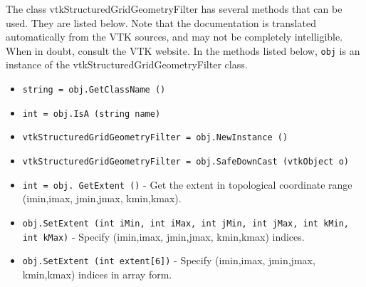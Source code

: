 The class vtkStructuredGridGeometryFilter has several methods that can be used.
  They are listed below.
Note that the documentation is translated automatically from the VTK sources,
and may not be completely intelligible.  When in doubt, consult the VTK website.
In the methods listed below, \verb|obj| is an instance of the vtkStructuredGridGeometryFilter class.
\begin{itemize}
\item  \verb|string = obj.GetClassName ()|

\item  \verb|int = obj.IsA (string name)|

\item  \verb|vtkStructuredGridGeometryFilter = obj.NewInstance ()|

\item  \verb|vtkStructuredGridGeometryFilter = obj.SafeDownCast (vtkObject o)|

\item  \verb|int = obj. GetExtent ()| -  Get the extent in topological coordinate range (imin,imax, jmin,jmax,
 kmin,kmax).

\item  \verb|obj.SetExtent (int iMin, int iMax, int jMin, int jMax, int kMin, int kMax)| -  Specify (imin,imax, jmin,jmax, kmin,kmax) indices.

\item  \verb|obj.SetExtent (int extent[6])| -  Specify (imin,imax, jmin,jmax, kmin,kmax) indices in array form.

\end{itemize}
